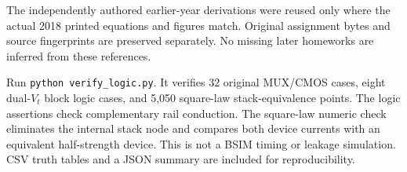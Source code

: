 \documentclass[11pt]{article}
\begin{document}
The independently authored earlier-year derivations were reused only where
the actual 2018 printed equations and figures match. Original assignment
bytes and source fingerprints are preserved separately. No missing later
homeworks are inferred from these references.

Run \texttt{python verify\_logic.py}. It verifies 32 original MUX/CMOS cases,
eight dual-$V_t$ block logic cases, and 5,050 square-law stack-equivalence
points. The logic assertions check complementary rail conduction. The
square-law numeric check eliminates the internal stack node and compares
both device currents with an equivalent half-strength device. This is not
a BSIM timing or leakage simulation. CSV truth tables and a JSON summary
are included for reproducibility.
\end{document}
